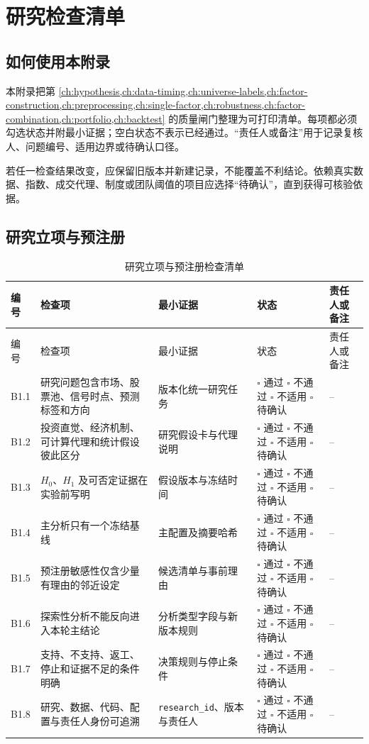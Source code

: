 \chapter{研究检查清单}
\label{app:checklists}

\newcommand{\quantcheckstatus}{%
  \(\square\) 通过\newline
  \(\square\) 不通过\newline
  \(\square\) 不适用\newline
  \(\square\) 待确认%
}

\section{如何使用本附录}

本附录把第 \cref{ch:hypothesis,ch:data-timing,ch:universe-labels,ch:factor-construction,ch:preprocessing,ch:single-factor,ch:robustness,ch:factor-combination,ch:portfolio,ch:backtest} 的质量闸门整理为可打印清单。每项都必须勾选状态并附最小证据；空白状态不表示已经通过。“责任人或备注”用于记录复核人、问题编号、适用边界或待确认口径。

若任一检查结果改变，应保留旧版本并新建记录，不能覆盖不利结论。依赖真实数据、指数、成交代理、制度或团队阈值的项目应选择“待确认”，直到获得可核验依据。

\section{研究立项与预注册}

\begingroup
\footnotesize
\setlength{\tabcolsep}{2.5pt}
\begin{longtable}{@{}p{1.0cm}p{4.4cm}p{4.6cm}p{2.8cm}p{2.4cm}@{}}
\caption{研究立项与预注册检查清单}\label{tab:appB-preregistration}\\
\toprule
编号 & 检查项 & 最小证据 & 状态 & 责任人或备注 \\
\midrule
\endfirsthead
\toprule
编号 & 检查项 & 最小证据 & 状态 & 责任人或备注 \\
\midrule
\endhead
B1.1 & 研究问题包含市场、股票池、信号时点、预测标签和方向 & 版本化统一研究任务 & \quantcheckstatus & -- \\
B1.2 & 投资直觉、经济机制、可计算代理和统计假设彼此区分 & 研究假设卡与代理说明 & \quantcheckstatus & -- \\
B1.3 & \(H_0\)、\(H_1\) 及可否定证据在实验前写明 & 假设版本与冻结时间 & \quantcheckstatus & -- \\
B1.4 & 主分析只有一个冻结基线 & 主配置及摘要哈希 & \quantcheckstatus & -- \\
B1.5 & 预注册敏感性仅含少量有理由的邻近设定 & 候选清单与事前理由 & \quantcheckstatus & -- \\
B1.6 & 探索性分析不能反向进入本轮主结论 & 分析类型字段与新版本规则 & \quantcheckstatus & -- \\
B1.7 & 支持、不支持、返工、停止和证据不足的条件明确 & 决策规则与停止条件 & \quantcheckstatus & -- \\
B1.8 & 研究、数据、代码、配置与责任人身份可追溯 & \texttt{research\_id}、版本与责任人 & \quantcheckstatus & -- \\
\bottomrule
\end{longtable}
\endgroup

